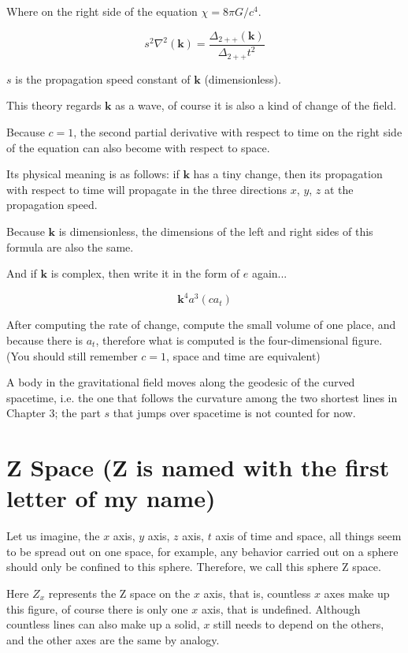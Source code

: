 \documentclass[UTF8]{article}
\begin{document}
Where on the right side of the equation \(\chi=8\pi G/c^4\).

\begin{equation}
s^2\nabla^2(\mathbf{k})=\frac{\Delta_{2++}(\mathbf{k})}{\Delta_{2++}t^2}
\end{equation}

\(s\) is the propagation speed constant of \(\mathbf{k}\) (dimensionless).

This theory regards \(\mathbf{k}\) as a wave, of course it is also a kind of change of the field.

Because \(c=1\), the second partial derivative with respect to time on the right side of the equation can also become with respect to space.

Its physical meaning is as follows: if \(\mathbf{k}\) has a tiny change, then its propagation with respect to time will propagate in the three directions \(x\), \(y\), \(z\) at the propagation speed.

Because \(\mathbf{k}\) is dimensionless, the dimensions of the left and right sides of this formula are also the same.

And if \(\mathbf{k}\) is complex, then write it in the form of \(e\) again...

\begin{equation}
\mathbf{k}^4a^3(ca_t)
\end{equation}

After computing the rate of change, compute the small volume of one place, and because there is \(a_t\), therefore what is computed is the four-dimensional figure. (You should still remember \(c=1\), space and time are equivalent)


A body in the gravitational field moves along the geodesic of the curved spacetime, i.e. the one that follows the curvature among the two shortest lines in Chapter 3; the part \(s\) that jumps over spacetime is not counted for now.

\section{Z Space (Z is named with the first letter of my name)}

Let us imagine, the \(x\) axis, \(y\) axis, \(z\) axis, \(t\) axis of time and space, all things seem to be spread out on one space, for example, any behavior carried out on a sphere should only be confined to this sphere. Therefore, we call this sphere Z space.

Here \(Z_x\) represents the Z space on the \(x\) axis, that is, countless \(x\) axes make up this figure, of course there is only one \(x\) axis, that is undefined. Although countless lines can also make up a solid, \(x\) still needs to depend on the others, and the other axes are the same by analogy.
\end{document}

